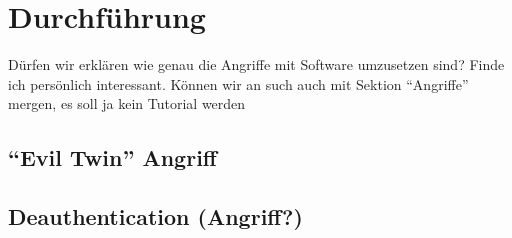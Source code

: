 \section{Durchführung}
Dürfen wir erklären wie genau die Angriffe mit Software umzusetzen sind? Finde ich persönlich interessant.
Können wir an such auch mit Sektion \enquote{Angriffe} mergen, es soll ja kein Tutorial werden

\subsection{\enquote{Evil Twin} Angriff}

\subsection{Deauthentication (Angriff?)}